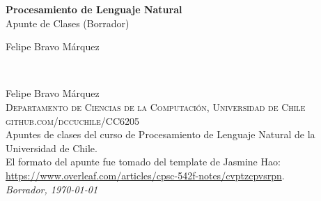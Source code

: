 \documentclass[11pt,fleqn]{book} %
\begin{document}

\begingroup
\thispagestyle{empty}
\centering
\vspace*{5cm}
\par\normalfont\fontsize{35}{35}\sffamily\selectfont
\textbf{Procesamiento de Lenguaje Natural}\\
{\LARGE Apunte de Clases (Borrador)}\par %
\vspace*{1cm}
{\Huge Felipe Bravo Márquez}\par %
\endgroup


\newpage
~\vfill
\thispagestyle{empty}

\noindent Felipe Bravo Márquez\\

\noindent \textsc{Departamento de Ciencias de la Computación, Universidad de Chile}\\

\noindent \textsc{github.com/dccuchile/CC6205}\\ %

\noindent Apuntes de clases del curso de Procesamiento de Lenguaje Natural de la Universidad de Chile.\\ %

\noindent El formato del apunte fue tomado del template de Jasmine Hao: \url{https://www.overleaf.com/articles/cpsc-542f-notes/cvptzcpvsrpn}. \\

\noindent \textit{Borrador, \today} %



\pagestyle{empty} %

\tableofcontents %
\end{document}
